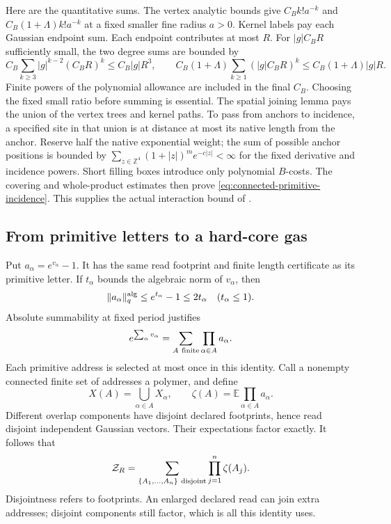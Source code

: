 \documentclass[11pt,reqno]{amsart}
\numberwithin{equation}{section}
\theoremstyle{definition}
\theoremstyle{remark}
\begin{document}
Here are the quantitative sums.
The vertex analytic bounds give \(C_B k!a^{-k}\)
and \(C_B(1+\Lambda)k!a^{-k}\) at a fixed
smaller fine radius \(a>0\).
Kernel labels pay each Gaussian endpoint
sum. Each endpoint contributes at most \(R\).
For \(|g|C_BR\) sufficiently small, the two
degree sums are bounded by
\[
 C_B\sum_{k\ge3}|g|^{k-2}(C_BR)^k
                      \le C_B|g|R^3,\qquad
 C_B(1+\Lambda)\sum_{k\ge1}(|g|C_BR)^k
                      \le C_B(1+\Lambda)|g|R .
\]
Finite powers of the polynomial allowance
are included in the final \(C_B\).
Choosing the fixed small ratio before
summing is essential.
The spatial joining lemma pays the union
of the vertex trees and kernel paths.
To pass from anchors to incidence, a
specified site in that union is at
distance at most its native length
from the anchor.
Reserve half the native exponential
weight; the sum of possible anchor
positions is bounded by
\(\sum_{z\in\mathbb Z^4}(1+|z|)^m e^{-c|z|}<\infty\)
for the fixed derivative and incidence
powers. Short filling boxes introduce
only polynomial \(B\)-costs.
The covering and whole-product estimates
then prove
\eqref{eq:connected-primitive-incidence}.
This supplies the actual interaction
bound of \cite[Lemma~24.1, pp.~120--121]{Main}.

\subsection{From primitive letters to a hard-core gas}

Put \(a_\alpha=e^{v_\alpha}-1\).
It has the same read footprint and finite
length certificate as its primitive letter.
If \(t_\alpha\) bounds the algebraic norm
of \(v_\alpha\), then
\[
          \|a_\alpha\|^{\rm alg}_q
                   \le e^{t_\alpha}-1\le2t_\alpha
                            \quad(t_\alpha\le1).
\]
Absolute summability at fixed period
justifies
\[
           e^{\sum_\alpha v_\alpha}
                =\sum_{A\ {\rm finite}}\prod_{\alpha\in A}a_\alpha.
\]
Each primitive address is selected at
most once in this identity.
Call a nonempty connected finite set
of addresses a polymer, and define
\[
       X(A)=\bigcup_{\alpha\in A}X_\alpha,\qquad
       \zeta(A)=\mathbb E\prod_{\alpha\in A}a_\alpha .
\]
Different overlap components have disjoint
declared footprints, hence read disjoint
independent Gaussian vectors.
Their expectations factor exactly.
It follows that
\begin{equation}
          \mathcal Z_R
              =\sum_{\{A_1,\ldots,A_n\}\ {\rm disjoint}}
                                      \prod_{j=1}^n\zeta(A_j).
 \label{eq:connected-polymer-gas}
\end{equation}
Disjointness refers to footprints.
An enlarged declared read can join extra
addresses; disjoint components still
factor, which is all this identity uses.
\end{document}

